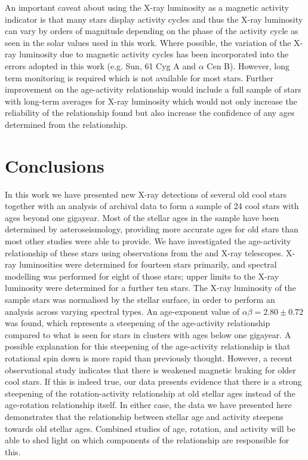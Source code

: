 An important caveat about using the X-ray luminosity as a magnetic activity indicator is that many stars display activity cycles and thus the X-ray luminosity can vary by orders of magnitude depending on the phase of the activity cycle as seen in the solar values used in this work. Where possible, the variation of the X-ray luminosity due to magnetic activity cycles has been incorporated into the errors adopted in this work (e.g. Sun, 61 Cyg A and $\alpha$ Cen B). However, long term monitoring is required which is not available for most stars. Further improvement on the age-activity relationship would include a full sample of stars with long-term averages for X-ray luminosity which would not only increase the reliability of the relationship found but also increase the confidence of any ages determined from the relationship.

\section{Conclusions}
In this work we have presented new X-ray detections of several old cool stars together with an analysis of archival data to form a sample of 24 cool stars with ages beyond one gigayear. Most of the stellar ages in the sample have been determined by asteroseismology, providing more accurate ages for old stars than most other studies were able to provide. We have investigated the age-activity relationship of these stars using observations from the \Chandra and \XMM X-ray telescopes. X-ray luminosities were determined for fourteen stars primarily, and spectral modelling was performed for eight of those stars; upper limits to the X-ray luminosity were determined for a further ten stars. The X-ray luminosity of the sample stars was normalised by the stellar surface, in order to  perform an analysis across varying spectral types. An age-exponent value of $\alpha\beta = 2.80 \pm 0.72$ was found, which represents a steepening of the age-activity relationship compared to what is seen for stars in clusters with ages below one gigayear. A possible explanation for this steepening of the age-activity relationship is that rotational spin down is more rapid than previously thought. However, a recent observational study \citep{van_Saders_etal_2016} indicates that there is weakened magnetic braking for older cool stars. If this is indeed true, our data presents evidence that there is a strong steepening of the rotation-activity relationship at old stellar ages instead of the age-rotation relationship itself. In either case, the data we have presented here demonstrates that the relationship between stellar age and activity steepens towards old stellar ages. Combined studies of age, rotation, and activity will be able to shed light on which components of the relationship are responsible for this.

\newpage